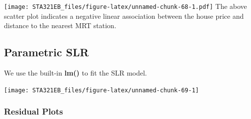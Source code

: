\documentclass[
]{book}
\newenvironment{Shaded}{\begin{snugshade}}{\end{snugshade}}
\newcommand{\AttributeTok}[1]{\textcolor[rgb]{0.13,0.29,0.53}{#1}}
\newcommand{\DecValTok}[1]{\textcolor[rgb]{0.00,0.00,0.81}{#1}}
\newcommand{\FunctionTok}[1]{\textcolor[rgb]{0.13,0.29,0.53}{\textbf{#1}}}
\newcommand{\NormalTok}[1]{#1}
\newcommand{\OtherTok}[1]{\textcolor[rgb]{0.56,0.35,0.01}{#1}}
\newcommand{\SpecialCharTok}[1]{\textcolor[rgb]{0.81,0.36,0.00}{\textbf{#1}}}
\newcommand{\StringTok}[1]{\textcolor[rgb]{0.31,0.60,0.02}{#1}}
\begin{document}
\begin{Shaded}
\end{Shaded}

\texttt{[image: STA321EB\_files/figure-latex/unnamed-chunk-68-1.pdf]}
The above scatter plot indicates a negative linear association between the house price and distance to the nearest MRT station.

\hypertarget{parametric-slr}{%
\subsection{Parametric SLR}\label{parametric-slr}}

We use the built-in \textbf{lm()} to fit the SLR model.

\begin{Shaded}
\end{Shaded}

\begin{center}\texttt{[image: STA321EB\_files/figure-latex/unnamed-chunk-69-1]} \end{center}

\hypertarget{residual-plots}{%
\subsubsection{Residual Plots}\label{residual-plots}}
\end{document}
